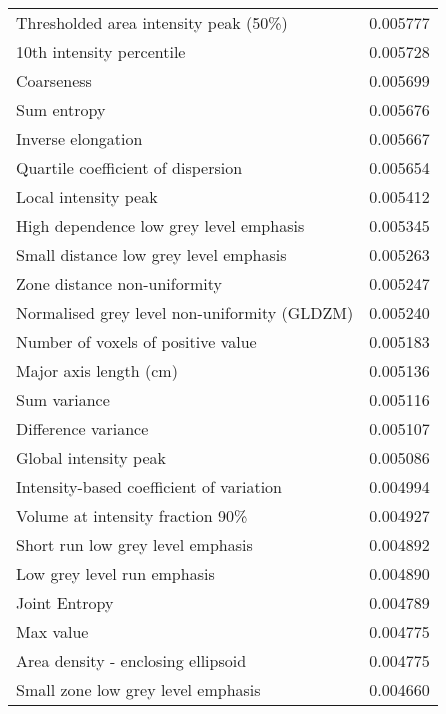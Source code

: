 \begin{tabular}{lr}
Thresholded area intensity peak (50\%)              &        0.005777 \\
10th intensity percentile                          &        0.005728 \\
Coarseness                                         &        0.005699 \\
Sum entropy                                        &        0.005676 \\
Inverse elongation                                 &        0.005667 \\
Quartile coefficient of dispersion                 &        0.005654 \\
Local intensity peak                               &        0.005412 \\
High dependence low grey level emphasis            &        0.005345 \\
Small distance low grey level emphasis             &        0.005263 \\
Zone distance non-uniformity                       &        0.005247 \\
Normalised grey level non-uniformity (GLDZM)       &        0.005240 \\
Number of voxels of positive value                 &        0.005183 \\
Major axis length (cm)                             &        0.005136 \\
Sum variance                                       &        0.005116 \\
Difference variance                                &        0.005107 \\
Global intensity peak                              &        0.005086 \\
Intensity-based coefficient of variation           &        0.004994 \\
Volume at intensity fraction 90\%                   &        0.004927 \\
Short run low grey level emphasis                  &        0.004892 \\
Low grey level run emphasis                        &        0.004890 \\
Joint Entropy                                      &        0.004789 \\
Max value                                          &        0.004775 \\
Area density - enclosing ellipsoid                 &        0.004775 \\
Small zone low grey level emphasis                 &        0.004660 \\

\end{tabular}
